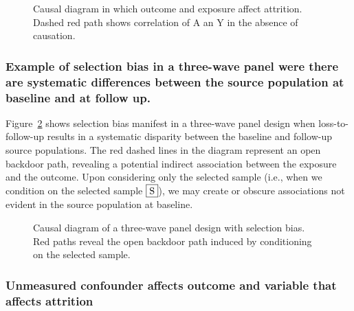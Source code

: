 \documentclass[
  singlecolumn,
  9pt]{article}
\begin{document}
\begin{figure}


\caption{\label{fig-3}Causal diagram in which outcome and exposure
affect attrition. Dashed red path shows correlation of A an Y in the
absence of causation.}

\end{figure}%

\subsubsection{Example of selection bias in a three-wave panel were
there are systematic differences between the source population at
baseline and at follow
up.}\label{example-of-selection-bias-in-a-three-wave-panel-were-there-are-systematic-differences-between-the-source-population-at-baseline-and-at-follow-up.}

Figure~\ref{fig-4} shows selection bias manifest in a three-wave panel
design when loss-to-follow-up results in a systematic disparity between
the baseline and follow-up source populations. The red dashed lines in
the diagram represent an open backdoor path, revealing a potential
indirect association between the exposure and the outcome. Upon
considering only the selected sample (i.e., when we condition on the
selected sample \(\framebox{S}\)), we may create or obscure associations
not evident in the source population at baseline.

\begin{figure}


\caption{\label{fig-4}Causal diagram of a three-wave panel design with
selection bias. Red paths reveal the open backdoor path induced by
conditioning on the selected sample.}

\end{figure}%

\subsubsection{Unmeasured confounder affects outcome and variable that
affects
attrition}\label{unmeasured-confounder-affects-outcome-and-variable-that-affects-attrition}
\end{document}
